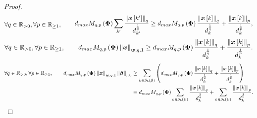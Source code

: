 \begin{proof}
\begin{gather*}
\forall q \in \mathbb{R}_{>0}, \forall p \in \mathbb{R}_{\geq 1}, \qquad
\begin{aligned}
d_{max} M_{q,p}\left( \boldsymbol{\Phi} \right) \displaystyle\sum_{k'} \frac{\left\lVert\boldsymbol{x}\left[ k' \right]\right\rVert_{q}}{d^{\frac1q}_{k'}} \geq 
 d_{max} M_{q,p}\left( \boldsymbol{\Phi} \right) \frac{\left\lVert\boldsymbol{x}\left[ k \right]\right\rVert_q}{d^{\frac1q}_{k}} 
+ \frac{\left\lVert\boldsymbol{x}\left[ k \right]\right\rVert_p}{d^{\frac1p}_{k}},
\end{aligned}
\end{gather*}
\begin{gather*} 
\begin{aligned}
\forall q \in \mathbb{R}_{>0}, \forall p \in \mathbb{R}_{\geq 1}, \qquad
d_{max} M_{q,p}\left( \boldsymbol{\Phi} \right) \left\lVert\boldsymbol{x}\right\rVert_{\boldsymbol{w};q,1} \geq 
 d_{max} M_{q,p}\left( \boldsymbol{\Phi} \right) \frac{\left\lVert\boldsymbol{x}\left[ k \right]\right\rVert_q}{d^{\frac1q}_{k}} 
+ \frac{\left\lVert\boldsymbol{x}\left[ k \right]\right\rVert_p}{d^{\frac1p}_{k}}.
\end{aligned}
\end{gather*}
{
\label{cmmnt:74} 
}
\begin{gather*} 
\mycolor{\begin{aligned}
\forall q \in \mathbb{R}_{>0}, \forall p \in \mathbb{R}_{\geq 1}, \qquad
d_{max} M_{q,p}\myparanthese{\myPhi} \mynorm{\boldsymbol{x}}_{\boldsymbol{w};q,1} \mynorm{\mybeta}_{r,0} &\geq 
\sum_{k \in S_b(\mybeta)} \myparanthese{d_{max} M_{q,p}\myparanthese{\myPhi} \frac{\mynorm{\boldsymbol{x}\mybracket{k}}_q}{d^{\frac1q}_{k}} 
+ \frac{\mynorm{\boldsymbol{x}\mybracket{k}}_p}{d^{\frac1p}_{k}}} \\
&=
d_{max} M_{q,p}\myparanthese{\myPhi} \sum_{k \in S_b(\mybeta)} \frac{\mynorm{\boldsymbol{x}\mybracket{k}}_q}{d^{\frac1q}_{k}}
+ \sum_{k \in S_b(\mybeta)} \frac{\mynorm{\boldsymbol{x}\mybracket{k}}_p}{d^{\frac1p}_{k}}.
\end{aligned}}

\end{gather*}
\end{proof}
